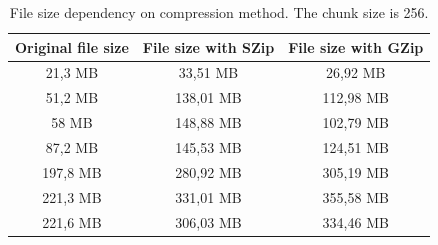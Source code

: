 \begin{table}
	\caption{File size dependency on compression method. The chunk size is 256.}
	\label{compression}
	\centering
	\begin{tabular}{|c|c|c|}
		\hline \textbf{Original file size}  & \textbf{File size with SZip} & \textbf{File size with GZip}\\
		\hline 21,3 MB &  33,51 MB & 26,92 MB\\ 
		\hline 51,2 MB & 138,01 MB& 112,98 MB \\ 
		\hline 58 MB    & 148,88 MB& 102,79 MB \\ 
		\hline 87,2 MB & 145,53 MB & 124,51 MB \\ 
		\hline 197,8 MB & 280,92 MB& 305,19 MB \\ 
		\hline 221,3 MB & 331,01 MB & 355,58 MB\\ 
		\hline 221,6 MB & 306,03 MB& 334,46 MB  \\	
		\hline 
	\end{tabular} 
\end{table}